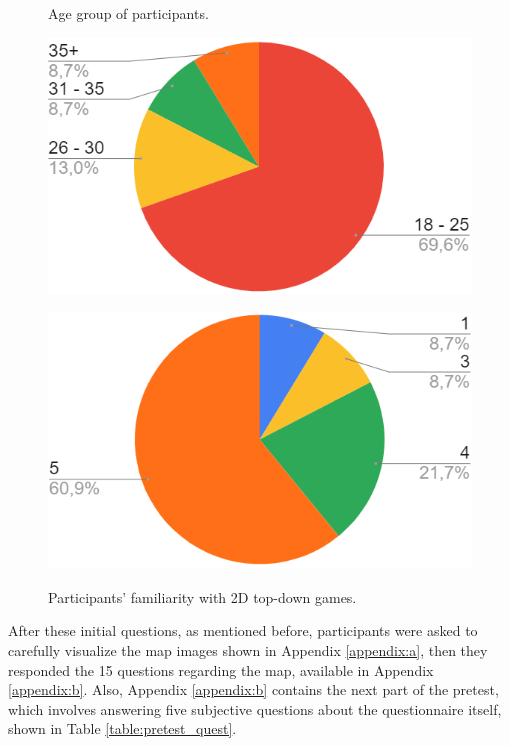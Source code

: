 \begin{figure}[h]
  \centering
  \begin{minipage}[b]{0.4\textwidth}
    \caption{Age group of participants.}
    \includegraphics[width=\textwidth]{images/survey/pretest_age.png}
    \label{fig:pre_age}
  \end{minipage}
  \hfill
  \begin{minipage}[b]{0.4\textwidth}
    \caption{Participants' familiarity with 2D top-down games.}
    \includegraphics[width=\textwidth]{images/survey/pretest_played.png}
    \label{fig:pre_game}
  \end{minipage}
\end{figure}

After these initial questions, as mentioned before, participants were asked to carefully visualize the map images shown in Appendix \ref{appendix:a}, then they responded the 15 questions regarding the map, available in Appendix \ref{appendix:b}. Also, Appendix \ref{appendix:b} contains the next part of the pretest, which involves answering five subjective questions about the questionnaire itself, shown in Table \ref{table:pretest_quest}.

